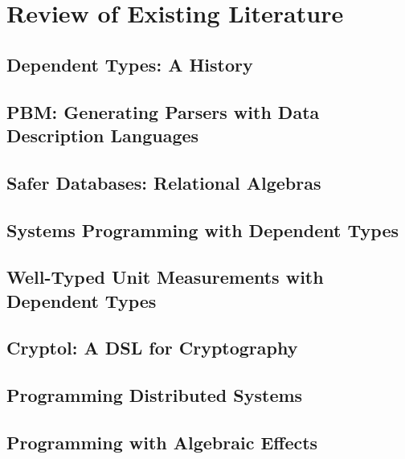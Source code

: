\chapter{Review of Existing Literature}

\section{Dependent Types: A History}


\section{PBM: Generating Parsers with Data Description Languages}



\section{Safer Databases: Relational Algebras}



\section{Systems Programming with Dependent Types}



\section{Well-Typed Unit Measurements with Dependent Types}



\section{Cryptol: A DSL for Cryptography}



\section{Programming Distributed Systems}



\section{Programming with Algebraic Effects}

